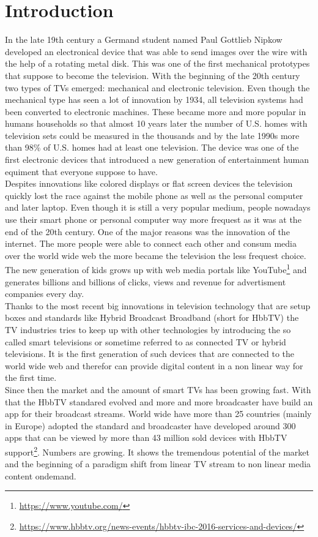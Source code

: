\chapter{Introduction\label{cha:introduction}}

In the late 19th century a Germand student named Paul Gottlieb Nipkow developed an electronical device
that was able to send images over the wire with the help of a rotating metal disk. This was one of the first
mechanical prototypes that suppose to become the television. With the beginning of the 20th century two types
of TVs emerged: mechanical and electronic television. Even though the mechanical type has seen a lot of
innovation by 1934, all television systems had been converted to electronic machines. These became more and
more popular in humans households so that almost 10 years later the number of U.S. homes with television sets
could be measured in the thousands and by the late 1990s more than 98\% of U.S. homes had at least one
television. The device was one of the first electronic devices that introduced a new generation of entertainment
human equiment that everyone suppose to have.\\
Despites innovations like colored displays or flat screen devices the television quickly lost the race against
the mobile phone as well as the personal computer and later laptop. Even though it is still a very popular
medium, people nowadays use their smart phone or personal computer way more frequest as it was at the end of the
20th century. One of the major reasons was the innovation of the internet. The more people were able to connect
each other and consum media over the world wide web the more became the television the less frequest choice.
The new generation of kids grows up with web media portals like YouTube\footnote{\url{https://www.youtube.com/}}
and generates billions and billions of clicks, views and revenue for advertisment companies every day.\\
Thanks to the most recent big innovations in television technology that are setup boxes and standards like
Hybrid Broadcast Broadband (short for HbbTV) the TV industries tries to keep up with other technologies by
introducing the so called smart televisions or sometime referred to as connected TV or hybrid televisions.
It is the first generation of such devices that are connected to the world wide web and therefor can provide
digital content in a non linear way for the first time.\\
Since then the market and the amount of smart TVs has been growing fast. With that the HbbTV standared evolved
and more and more broadcaster have build an app for their broadcast streams. World wide have more than 25
countries (mainly in Europe) adopted the standard and broadcaster have developed around 300 apps that can
be viewed by more than 43 million sold devices with HbbTV support\footnote{\url{https://www.hbbtv.org/news-events/hbbtv-ibc-2016-services-and-devices/}}.
Numbers are growing. It shows the tremendous potential of the market and the beginning of a paradigm shift
from linear TV stream to non linear media content ondemand.


